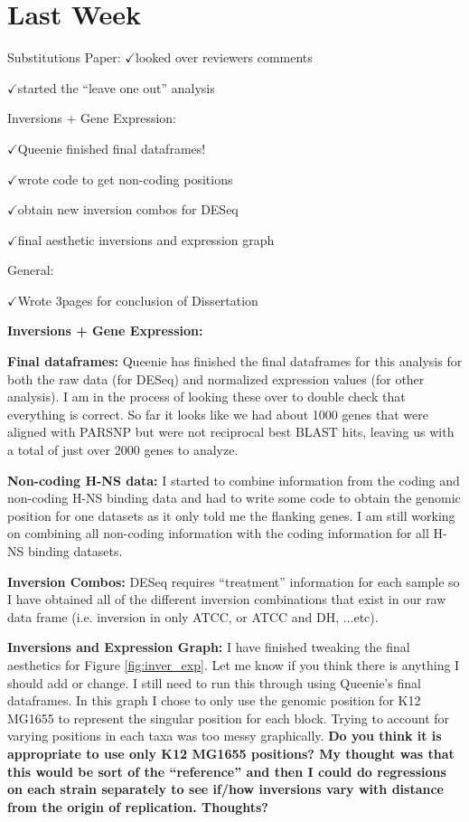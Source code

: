 \documentclass[12pt]{article}
\newcommand{\ch}{$\checkmark$}
\begin{document}

	
\section*{Last Week}
Substitutions Paper:
\ch looked over reviewers comments

\ch started the ``leave one out'' analysis

Inversions $+$ Gene Expression:

\ch Queenie finished final dataframes!

\ch wrote code to get non-coding positions

\ch obtain new inversion combos for DESeq

\ch final aesthetic inversions and expression graph

General:

\ch Wrote 3pages for conclusion of Dissertation

\bigskip

\textbf{Inversions + Gene Expression:}

\textbf{Final dataframes:}
Queenie has finished the final dataframes for this analysis for both the raw data (for DESeq) and normalized expression values (for other analysis).
I am in the process of looking these over to double check that everything is correct.
So far it looks like we had about 1000 genes that were aligned with PARSNP but were not reciprocal best BLAST hits, leaving us with a total of just over 2000 genes to analyze.


\textbf{Non-coding H-NS data:}
I started to combine information from the coding and non-coding H-NS binding data and had to write some code to obtain the genomic position for one datasets as it only told me the flanking genes.
I am still working on combining all non-coding information with the coding information for all H-NS binding datasets.

\textbf{Inversion Combos:}
DESeq requires ``treatment'' information for each sample so I have obtained all of the different inversion combinations that exist in our raw data frame (i.e. inversion in only ATCC, or ATCC and DH, ...etc).

\textbf{Inversions and Expression Graph:}
I have finished tweaking the final aesthetics for Figure \ref{fig:inver_exp}.
Let me know if you think there is anything I should add or change.
I still need to run this through using Queenie's final dataframes.
In this graph I chose to only use the genomic position for K12 MG1655 to represent the singular position for each block.
Trying to account for varying positions in each taxa was too messy graphically.
\textbf{Do you think it is appropriate to use only K12 MG1655 positions? My thought was that this would be sort of the ``reference'' and then I could do regressions on each strain separately to see if/how inversions vary with distance from the origin of replication. Thoughts?}
\end{document}
